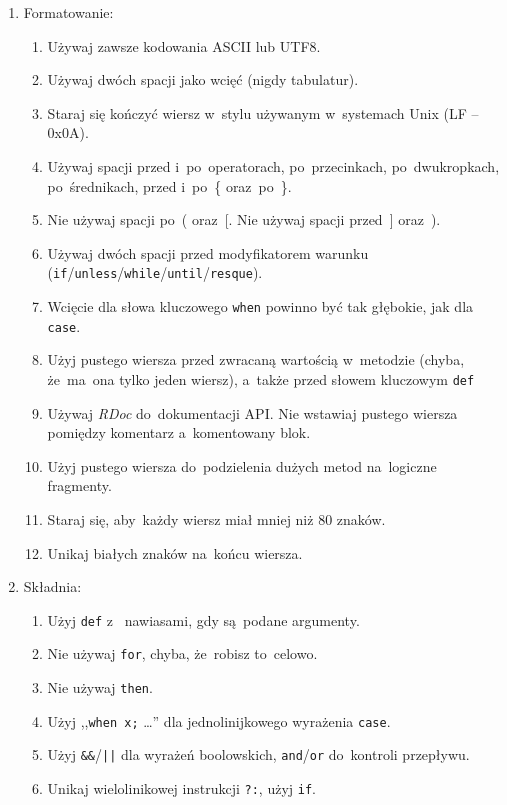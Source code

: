 \begin{enumerate}
  \item Formatowanie:
  \begin{enumerate}
    \item Używaj zawsze kodowania ASCII lub UTF8.
    \item Używaj dwóch spacji jako wcięć (nigdy tabulatur).
    \item Staraj się kończyć wiersz w~stylu używanym w~systemach Unix (LF -- 0x0A).
    \item Używaj spacji przed i~po~operatorach, po~przecinkach, po~dwukropkach, po~średnikach, przed i~po~\{ oraz~po~\}.
    \item Nie używaj spacji po~( oraz~[. Nie używaj spacji przed~] oraz~).
    \item Używaj dwóch spacji przed modyfikatorem warunku (\texttt{if}/\texttt{unless}/\texttt{while}/\texttt{until}/\texttt{resque}).
    \item Wcięcie dla słowa kluczowego \texttt{when} powinno być tak głębokie, jak dla \texttt{case}.
    \item Użyj pustego wiersza przed zwracaną wartością w~metodzie (chyba, że~ma~ona tylko jeden wiersz), a~także przed słowem kluczowym \texttt{def}
    \item Używaj \textit{RDoc} do~dokumentacji API. Nie wstawiaj pustego wiersza pomiędzy komentarz a~komentowany blok.
    \item Użyj pustego wiersza do~podzielenia dużych metod na~logiczne fragmenty.
    \item Staraj się, aby~każdy wiersz miał mniej niż 80 znaków.
    \item Unikaj białych znaków na~końcu wiersza.
  \end{enumerate}
  \item Składnia:
  \begin{enumerate}
    \item Użyj \texttt{def} z~ nawiasami, gdy są~podane argumenty.
    \item Nie używaj \texttt{for}, chyba, że~robisz to~celowo.
    \item Nie używaj \texttt{then}.
    \item Użyj ,,\texttt{when x;} \ldots'' dla jednolinijkowego wyrażenia \texttt{case}.
    \item Użyj \texttt{\&\&}/\texttt{||} dla wyrażeń boolowskich, \texttt{and}/\texttt{or} do~kontroli przepływu.
    \item Unikaj wielolinikowej instrukcji \texttt{?:}, użyj \texttt{if}.

\end{enumerate}
\end{enumerate}
